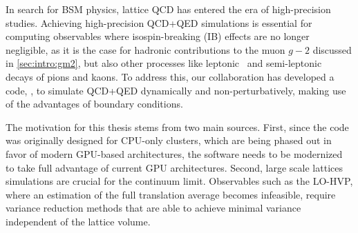 


In search for BSM physics, lattice QCD has entered the era of high-precision studies.
Achieving high-precision QCD+QED simulations is essential for computing observables where isospin-breaking (IB) effects are no longer negligible, as it is the case for hadronic contributions to the muon $g-2$ discussed in \cref{sec:intro:gm2}, but also other processes like leptonic~\cite{Boyle:2022lsi,PhysRevD.91.074506} and semi-leptonic~\cite{Tantalo:2013ty} decays of pions and kaons.
To address this, our collaboration has developed a code, \openqxd, to simulate QCD+QED dynamically and non-perturbatively, making use of the advantages of \Cstar boundary conditions.

The motivation for this thesis stems from two main sources.
First, since the code was originally designed for CPU-only clusters, which are being phased out in favor of modern GPU-based architectures, the software needs to be modernized to take full advantage of current GPU architectures.
Second, large scale lattices simulations are crucial for the continuum limit.
Observables such as the LO-HVP, where an estimation of the full translation average becomes infeasible, require variance reduction methods that are able to achieve minimal variance independent of the lattice volume.


